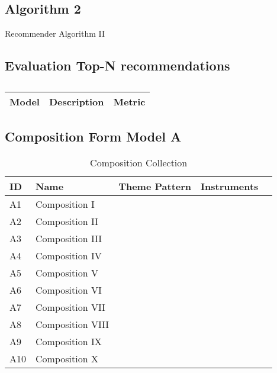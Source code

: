 \subsection{Algorithm 2}

\begin{algorithm}[H]
\begin{algorithmic}[1]

\end{algorithmic}
\caption{Recommender Algorithm II}
\label{Recommender_1}
\end{algorithm}

\subsection{Evaluation Top-N recommendations}

\centering	
\begin{table}[H]\tiny
	\caption{}	
	\begin{tabular}{r|p{4cm}|l}
		\hline	
		Model & Description & Metric \\
		\hline 
		\hline 
	\end{tabular}
\end{table}

\subsection{Composition Form Model A}

\begin{table}[H]
\caption{Composition Collection}	
\begin{tabular}{p{1cm}p{4cm}p{2cm}p{1cm}p{1cm}}
\hline
ID & Name & Theme Pattern & Instruments & \\
\hline 
A1 & Composition I &  &  & \\
A2 & Composition II &  &  & \\
A3 & Composition III &  & \\
A4 & Composition IV & & \\
A5 & Composition V & & & \\
\hline 
A6 & Composition VI &  &  & \\
A7 & Composition VII &  &  & \\
A8 & Composition VIII &  & \\
A9 & Composition IX & & \\
A10 & Composition X & & & \\
\end{tabular}
\end{table}

